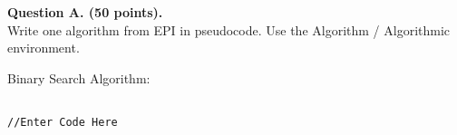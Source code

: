 \documentclass[12pt]{article}
\begin{document}
\noindent
\textbf{Question A. (50 points).}\\
Write one algorithm from EPI in pseudocode. Use the Algorithm / Algorithmic environment.

Binary Search Algorithm:

\begin{verbatim}

//Enter Code Here

\end{verbatim}
\end{document}
